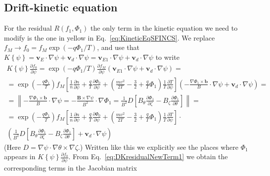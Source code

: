 \documentclass[12pt]{article}
\newcommand{\p}{\partial}
\newcommand{\na}{\nabla}
\begin{document}
\subsection*{Drift-kinetic equation}
For the residual $R\left(f_{1}, \Phi_1\right)$ the only term in the kinetic equation we need to modify is the one in yellow in Eq.~\ref{eq:KineticEqSFINCS}. 
We replace $f_M \rightarrow f_0 = f_M \exp \left(- q \Phi_1 / T \right)$, 
and use that $K \left\{\psi\right\} = \bm{v}_E \cdot \na \psi + \bm{v}_d \cdot \na \psi = \bm{v}_{E1} \cdot \na \psi + \bm{v}_d \cdot \na \psi$
to write 
\begin{multline}
K \left\{\psi\right\} \frac{\p f_{0}}{\p \psi} =  \exp \left(- q \Phi_1 / T \right) \frac{\p f_{M}}{\p \psi} \left(\bm{v}_{E1} \cdot \na \psi + \bm{v}_d \cdot \na \psi\right) = \\ = 
\exp \left(- \frac{q \Phi_1}{T}  \right) f_{M} \left[\frac{1}{n} \frac{\p n}{\p \psi} + \frac{q}{T} \frac{\p \Phi_0}{\p \psi} + \left(\frac{m v^2}{2 T} - \frac{3}{2} + \frac{q}{T} \Phi_1\right) \frac{1}{T} \frac{\p T}{\p \psi}\right] 
 \left(- \frac{\na \Phi_1 \times \bm{b}}{B} \cdot \na \psi + \bm{v}_d \cdot \na \psi\right) = \\ =
 \left\| - \frac{\na \Phi_1 \times \bm{b}}{B} \cdot \na \psi = - \frac{ \bm{B} \times \na \psi}{B^2} \cdot  \na \Phi_1 = 
 \frac{1}{B^2} D \left[B_\theta \frac{\p \Phi_1}{\p \zeta} - B_\zeta \frac{\p \Phi_1}{\p \theta}\right] \right\| = \\ =
 \exp \left(- \frac{q \Phi_1}{T}  \right) f_{M} \left[\frac{1}{n} \frac{\p n}{\p \psi} + \frac{q}{T} \frac{\p \Phi_0}{\p \psi} + \left(\frac{m v^2}{2 T} - \frac{3}{2} + \frac{q}{T} \Phi_1\right) \frac{1}{T} \frac{\p T}{\p \psi}\right] \cdot \\
 \left(\frac{1}{B^2} D \left[B_\theta \frac{\p \Phi_1}{\p \zeta} - B_\zeta \frac{\p \Phi_1}{\p \theta}\right] + \bm{v}_d \cdot \na \psi\right)
\label{eq:DKresidualNewTerm1}
\end{multline}
(Here $D = \na \psi \cdot \na \theta \times \na \zeta$.)
Written like this we explicitly see the places where $\Phi_1$ appears in $\displaystyle K \left\{\psi\right\} \frac{\p f_{0}}{\p \psi}$. 
From Eq.~\ref{eq:DKresidualNewTerm1} we obtain the corresponding terms in the Jacobian matrix
\end{document}
